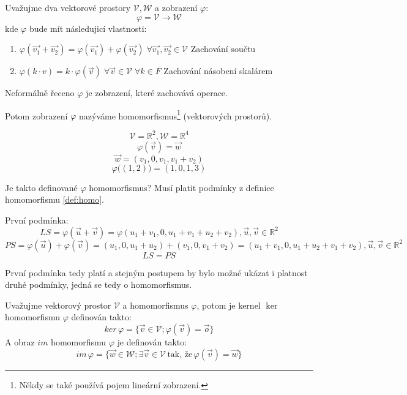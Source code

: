 \begin{definition}
    Uvažujme dva vektorové prostory $\mathcal{V}, \mathcal{W}$ a zobrazení $\varphi$:
    $$\varphi = \mathcal{V} \rightarrow \mathcal{W}$$
    kde $\varphi$ bude mít následujicí vlastnosti:
    \begin{enumerate}
        \item $\varphi(\vec{v_1} + \vec{v_2}) = \varphi(\vec{v_1}) + \varphi(\vec{v_2})\;
            \forall \vec{v_1}, \vec{v_2} \in \mathcal{V}$ \hfill Zachování součtu
        \item $\varphi(k\cdot v) = k \cdot \varphi (\vec{v}) \;
            \forall \vec{v} \in \mathcal{V} \; \forall k \in F$ \hfill Zachování násobení skalárem
    \end{enumerate}
    Neformálně řeceno $\varphi$ je zobrazení, které zachovává operace.

    Potom zobrazení $\varphi$ nazýváme homomorfismus\footnote{Někdy se také používá pojem
    lineární zobrazení.} (vektorových prostorů).
    \label{def:homo}
\end{definition}

\begin{example}
    $$\mathcal{V} = \mathbb{R}^2, \mathcal{W} = \mathbb{R}^4$$
    $$\varphi(\vec{v}) = \vec{w}$$
    $$\vec{w} = (v_1, 0, v_1, v_1 + v_2)$$
    $$\varphi\big((1,2)\big) = (1, 0, 1, 3)$$

    Je takto definované $\varphi$ homomorfismus? Musí platit podmínky z definice
    homomorfismu \ref{def:homo}.

    První podmínka:
    $$LS = \varphi(\vec{u} + \vec{v}) = \varphi(u_1 + v_1, 0, u_1 + v_1 + u_2 + v_2),
    \vec{u}, \vec{v} \in \mathbb{R}^2$$
    $$PS = \varphi(\vec{u}) + \varphi(\vec{v}) = (u_1, 0, u_1 + u_2) + (v_1, 0, v_1 + v_2) =
    (u_1 + v_1, 0, u_1 + u_2 + v_1 + v_2), \vec{u}, \vec{v} \in \mathbb{R}^2$$
    $$LS = PS$$

    První podmínka tedy platí a stejným postupem by bylo možné ukázat i platnost
    druhé podmínky, jedná se tedy o homomorfismus.
\end{example}

\begin{definition} Uvažujme vektorový prostor $\mathcal{V}$
    a homomorfismus $\varphi$, potom je kernel $\ker$ homomorfismu $\varphi$ definován takto:
    $$ker\,\varphi = \{\vec{v} \in \mathcal{V}; \varphi(\vec{v}) = \vec{o}\}$$
    A obraz $im$ homomorfismu $\varphi$ je definován takto:
    $$im\,\varphi = \{\vec{w} \in \mathcal{W}; \exists \vec{v} \in \mathcal{V}\,
        \text{tak, že}\, \varphi(\vec{v}) = \vec{w}\}$$
\end{definition}

